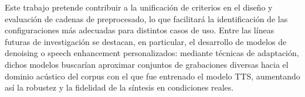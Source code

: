 Este trabajo pretende contribuir a la unificación de criterios en el diseño y evaluación de cadenas de preprocesado, lo que facilitará la identificación de las configuraciones más adecuadas para distintos casos de uso. Entre las líneas futuras de investigación se destacan, en particular, el desarrollo de modelos de denoising o speech enhancement personalizados: mediante técnicas de adaptación, dichos modelos buscarían aproximar conjuntos de grabaciones diversas hacia el dominio acústico del corpus con el que fue entrenado el modelo TTS, aumentando así la robustez y la fidelidad de la síntesis en condiciones reales.